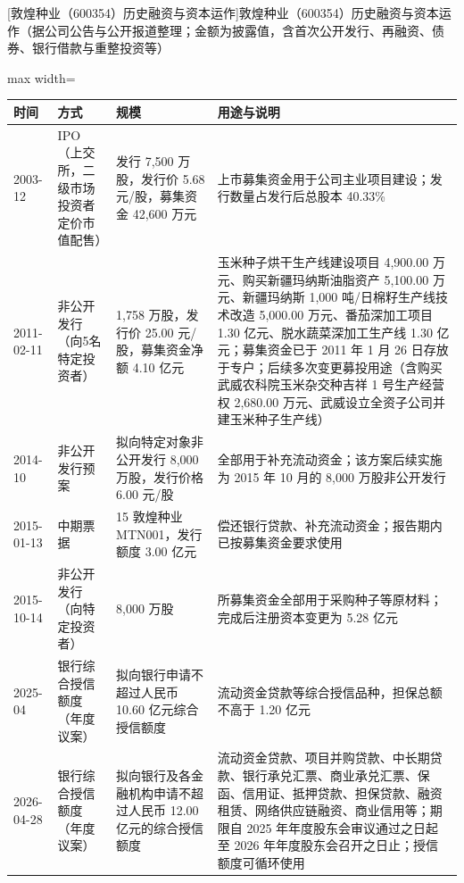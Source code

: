 \begin{center}\small\setlength{\tabcolsep}{4pt}
[敦煌种业（600354）历史融资与资本运作]{敦煌种业（600354）历史融资与资本运作（据公司公告与公开报道整理；金额为披露值，含首次公开发行、再融资、债券、银行借款与重整投资等）}
\begin{adjustbox}{max width=\textwidth}
\begin{tabular}{@{}p{1.45cm}p{2.55cm}p{4.05cm}p{4.95cm}@{}}
\toprule
时间 & 方式 & 规模 & 用途与说明 \\
\midrule
2003-12 & IPO（上交所，二级市场投资者定价市值配售） & 发行 7,\allowbreak{}500 万股，\allowbreak{}发行价 5.68 元/\allowbreak{}股，\allowbreak{}募集资金 42,\allowbreak{}600 万元 & 上市募集资金用于公司主业项目建设；发行数量占发行后总股本 40.33\% \\
2011-02-11 & 非公开发行（向5名特定投资者） & 1,\allowbreak{}758 万股，\allowbreak{}发行价 25.00 元/\allowbreak{}股，\allowbreak{}募集资金净额 4.10 亿元 & 玉米种子烘干生产线建设项目 4,\allowbreak{}900.00 万元、\allowbreak{}购买新疆玛纳斯油脂资产 5,\allowbreak{}100.00 万元、\allowbreak{}新疆玛纳斯 1,\allowbreak{}000 吨/\allowbreak{}日棉籽生产线技术改造 5,\allowbreak{}000.00 万元、\allowbreak{}番茄深加工项目 1.30 亿元、\allowbreak{}脱水蔬菜深加工生产线 1.30 亿元；募集资金已于 2011 年 1 月 26 日存放于专户；后续多次变更募投用途（含购买武威农科院玉米杂交种吉祥 1 号生产经营权 2,\allowbreak{}680.00 万元、\allowbreak{}武威设立全资子公司并建玉米种子生产线） \\
2014-10 & 非公开发行预案 & 拟向特定对象非公开发行 8,\allowbreak{}000 万股，\allowbreak{}发行价格 6.00 元/\allowbreak{}股 & 全部用于补充流动资金；该方案后续实施为 2015 年 10 月的 8,\allowbreak{}000 万股非公开发行 \\
2015-01-13 & 中期票据 & 15 敦煌种业 MTN001，\allowbreak{}发行额度 3.00 亿元 & 偿还银行贷款、\allowbreak{}补充流动资金；报告期内已按募集资金要求使用 \\
2015-10-14 & 非公开发行（向特定投资者） & 8,\allowbreak{}000 万股 & 所募集资金全部用于采购种子等原材料；完成后注册资本变更为 5.28 亿元 \\
2025-04 & 银行综合授信额度（年度议案） & 拟向银行申请不超过人民币 10.60 亿元综合授信额度 & 流动资金贷款等综合授信品种，\allowbreak{}担保总额不高于 1.20 亿元 \\
2026-04-28 & 银行综合授信额度（年度议案） & 拟向银行及各金融机构申请不超过人民币 12.00 亿元的综合授信额度 & 流动资金贷款、\allowbreak{}项目并购贷款、\allowbreak{}中长期贷款、\allowbreak{}银行承兑汇票、\allowbreak{}商业承兑汇票、\allowbreak{}保函、\allowbreak{}信用证、\allowbreak{}抵押贷款、\allowbreak{}担保贷款、\allowbreak{}融资租赁、\allowbreak{}网络供应链融资、\allowbreak{}商业信用等；期限自 2025 年年度股东会审议通过之日起至 2026 年年度股东会召开之日止；授信额度可循环使用 \\
\bottomrule
\end{tabular}
\end{adjustbox}
\end{center}


